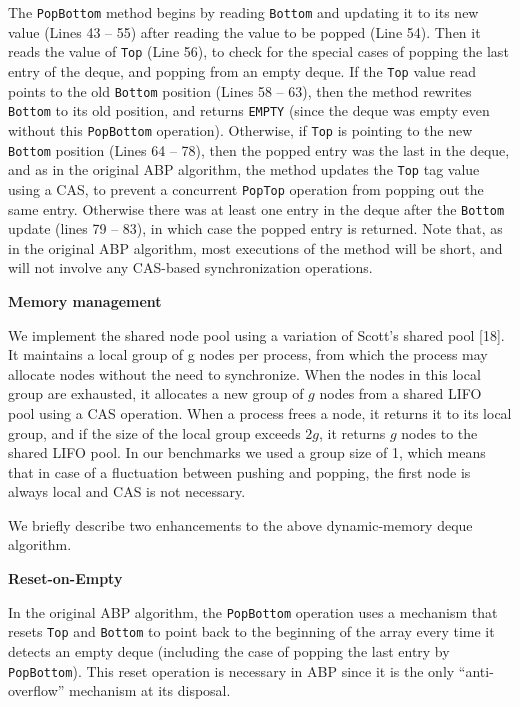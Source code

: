 The \lstinline!PopBottom! method begins by reading \lstinline!Bottom!
and updating it to its new value (Lines 43 -- 55) after reading the value
to be popped (Line 54). Then it reads the value of \lstinline!Top!
(Line 56), to check for the special cases of popping the last entry of
the deque, and popping from an empty deque. If the \lstinline!Top!
value read points to the old \lstinline!Bottom! position (Lines 58 -- 
63), then the method rewrites \lstinline!Bottom! to its old position,
and returns \lstinline!EMPTY! (since the deque was empty even without
this \lstinline!PopBottom! operation). Otherwise, if \lstinline!Top!
is pointing to the new \lstinline!Bottom! position (Lines 64 -- 78), then
the popped entry was the last in the deque, and as in the original ABP
algorithm, the method updates the \lstinline!Top! tag value using a
CAS, to prevent a concurrent \lstinline!PopTop! operation from
popping out the same entry. Otherwise there was at least one entry in
the deque after the \lstinline!Bottom! update (lines 79 -- 83), in which
case the popped entry is returned. Note that, as in the original ABP
algorithm, most executions of the method will be short, and will not
involve any CAS-based synchronization operations.

\textbf{Memory management}

We implement the shared node pool using a variation of Scott's shared
pool [18]. It maintains a local group of g nodes per process, from
which the process may allocate nodes without the need to
synchronize. When the nodes in this local group are exhausted, it
allocates a new group of $g$ nodes from a shared LIFO pool using a CAS
operation. When a process frees a node, it returns it to its local
group, and if the size of the local group exceeds $2g$, it returns $g$
nodes to the shared LIFO pool. In our benchmarks we used a group size
of 1, which means that in case of a fluctuation between pushing and
popping, the first node is always local and CAS is not necessary.


We briefly describe two enhancements to the above dynamic-memory deque
algorithm.

\textbf{Reset-on-Empty}

In the original ABP algorithm, the \lstinline!PopBottom! operation
uses a mechanism that resets \lstinline!Top! and \lstinline!Bottom! to
point back to the beginning of the array every time it detects an
empty deque (including the case of popping the last entry by
\lstinline!PopBottom!). This reset operation is necessary in ABP since
it is the only ``anti-overflow'' mechanism at its disposal.

